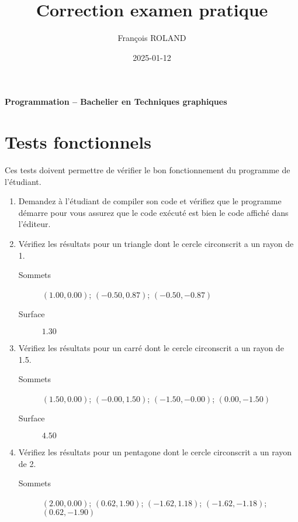 \documentclass[11pt,french,a4paper,twoside]{scrartcl}
\date{2025-01-12} %
\title{Correction examen pratique}
\author{François ROLAND}
\newcommand{\thesubtitle}{Programmation -- Bachelier en Techniques graphiques} %
\begin{document}
\noindent{}%
%
\noindent{}%
\noindent{}%
\textbf{\thetitle{} \hfill{} \thesubtitle{}}

\vspace{1em}

\section{Tests fonctionnels}

Ces tests doivent permettre de vérifier le bon fonctionnement du programme de l'étudiant.

\begin{enumerate}
	\item Demandez à l'étudiant de compiler son code et vérifiez que le programme démarre  pour vous assurez que le code exécuté est bien le code affiché dans l'éditeur.
	\item Vérifiez les résultats pour un triangle dont le cercle circonscrit a un rayon de \num{1}.
	      \begin{description}
		      \item[Sommets] \(\left(\num{1.00}, \num{0.00}\right)\); \(\left(\num{-0.50}, \num{0.87}\right)\); \(\left(\num{-0.50}, \num{-0.87}\right)\)
		      \item[Surface] \(\num{1.30}\)
	      \end{description}
	\item Vérifiez les résultats pour un carré dont le cercle circonscrit a un rayon de \num{1.5}.
	      \begin{description}
		      \item[Sommets] \(\left(\num{1.50}, \num{0.00}\right)\); \(\left(\num{-0.00}, \num{1.50}\right)\); \(\left(\num{-1.50}, \num{-0.00}\right)\); \(\left(\num{0.00}, \num{-1.50}\right)\)
		      \item[Surface] \(\num{4.50}\)
	      \end{description}
	\item Vérifiez les résultats pour un pentagone dont le cercle circonscrit a un rayon de \num{2}.
	      \begin{description}
		      \item[Sommets] \(\left(\num{2.00}, \num{0.00}\right)\); \(\left(\num{0.62}, \num{1.90}\right)\); \(\left(\num{-1.62}, \num{1.18}\right)\); \(\left(\num{-1.62}, \num{-1.18}\right)\); \(\left(\num{0.62}, \num{-1.90}\right)\)

\end{description}
\end{enumerate}
\end{document}
